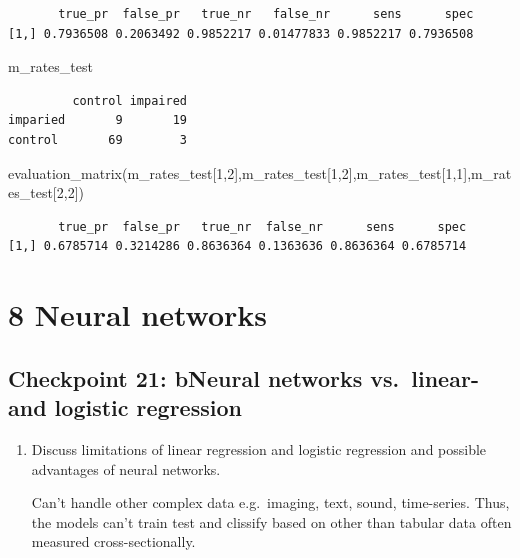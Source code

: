 \documentclass[
  letterpaper,
  DIV=11,
  numbers=noendperiod]{scrartcl}
\newenvironment{Shaded}{\begin{snugshade}}{\end{snugshade}}
\newcommand{\DecValTok}[1]{\textcolor[rgb]{0.68,0.00,0.00}{#1}}
\newcommand{\FunctionTok}[1]{\textcolor[rgb]{0.28,0.35,0.67}{#1}}
\newcommand{\NormalTok}[1]{\textcolor[rgb]{0.00,0.23,0.31}{#1}}
\begin{document}
\begin{verbatim}
       true_pr  false_pr   true_nr   false_nr      sens      spec
[1,] 0.7936508 0.2063492 0.9852217 0.01477833 0.9852217 0.7936508
\end{verbatim}

\begin{Shaded}
\begin{Highlighting}[]
\NormalTok{m\_rates\_test}
\end{Highlighting}
\end{Shaded}

\begin{verbatim}
         control impaired
imparied       9       19
control       69        3
\end{verbatim}

\begin{Shaded}
\begin{Highlighting}[]
\FunctionTok{evaluation\_matrix}\NormalTok{(m\_rates\_test[}\DecValTok{1}\NormalTok{,}\DecValTok{2}\NormalTok{],m\_rates\_test[}\DecValTok{1}\NormalTok{,}\DecValTok{2}\NormalTok{],m\_rates\_test[}\DecValTok{1}\NormalTok{,}\DecValTok{1}\NormalTok{],m\_rates\_test[}\DecValTok{2}\NormalTok{,}\DecValTok{2}\NormalTok{])}
\end{Highlighting}
\end{Shaded}

\begin{verbatim}
       true_pr  false_pr   true_nr  false_nr      sens      spec
[1,] 0.6785714 0.3214286 0.8636364 0.1363636 0.8636364 0.6785714
\end{verbatim}

\hypertarget{neural-networks}{%
\section{8 Neural networks}\label{neural-networks}}

\hypertarget{checkpoint-21-bneural-networks-vs.-linear--and-logistic-regression}{%
\subsection{Checkpoint 21: bNeural networks vs.~linear- and logistic
regression}\label{checkpoint-21-bneural-networks-vs.-linear--and-logistic-regression}}

\begin{enumerate}
\def\labelenumi{(\alph{enumi})}
\item
  Discuss limitations of linear regression and logistic regression and
  possible advantages of neural networks.

  Can't handle other complex data e.g.~imaging, text, sound,
  time-series. Thus, the models can't train test and clissify based on
  other than tabular data often measured cross-sectionally.
\end{enumerate}
\end{document}
